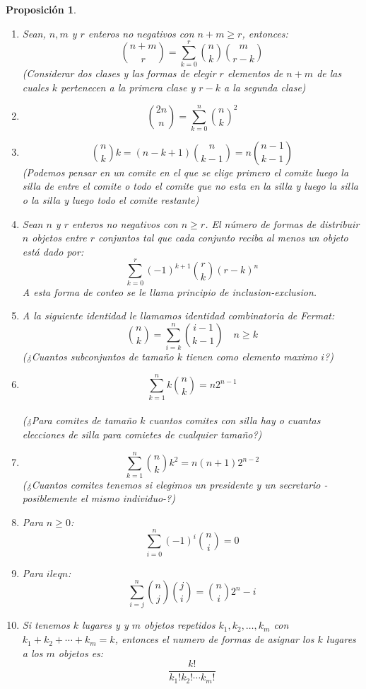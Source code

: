 \documentclass[14pt]{extarticle}
\newtheorem{theorem}{Teorema}[section]
\newtheorem{proposition}[theorem]{Proposición}
\begin{document}
\begin{proposition}
    \begin{enumerate}
    \item Sean, $n, m$ y $r$ enteros no negativos con $n + m \geq r$, entonces:
    $$ \binom{n+m}{r} = \sum_{k=0}^r \binom{n}{k} \binom{m}{r-k} $$
    (Considerar dos clases y las formas de elegir $r$ elementos de $n+m$ de las cuales $k$ pertenecen a la primera clase y $r-k$ a la segunda clase)

    \item $$ \binom{2n}{n} = \sum_{k=0}^n \binom{n}{k}^2 $$
    \item $$ \binom{n}{k} k = (n-k + 1) \binom{n}{k-1} = n \binom{n-1}{k-1} $$
    (Podemos pensar en un comite en el que se elige primero el comite luego la silla de entre el comite o todo el comite que no esta en la silla y luego la silla
o la silla y luego todo el comite restante)
    \item Sean $n$ y $r$ enteros no negativos con $n \geq r$. El número de formas de distribuir $n$ objetos entre $r$ conjuntos
    tal que cada conjunto reciba al menos un objeto está dado por:
    \[
        \sum_{k=0}^r (-1)^{k+1}\binom{r}{k}(r-k)^n
    \]
    A esta forma de conteo se le llama principio de inclusion-exclusion.
    \item A la siguiente identidad le llamamos identidad combinatoria de Fermat:
    \[
        \binom{n}{k} = \sum_{i = k}^n \binom{i-1}{k-1} \quad n \geq k
    \]
    (¿Cuantos subconjuntos de tamaño $k$ tienen como elemento maximo $i$?)
    \item $$ \sum_{k=1}^n k \binom{n}{k} = n 2^{n-1} $$\\
    (¿Para comites de tamaño $k$ cuantos comites con silla hay o cuantas elecciones de silla para comietes de cualquier tamaño?)
    \item $$ \sum_{k=1}^n \binom{n}{k}k^2 = n (n+1) 2^{n-2} $$
    (¿Cuantos comites tenemos si elegimos un presidente y un secretario -posiblemente el mismo individuo-?)
    \item Para $n\geq 0$:
    \[
        \sum_{i=0}^n (-1)^{i}\binom{n}{i} = 0
    \]
    \item Para $i leq n$:$$\sum_{i=j}^n \binom{n}{j}\binom{j}{i} = \binom{n}{i} 2^n-i$$
    \item Si tenemos $k$ lugares y y $m$ objetos repetidos $k_1, k_2, \ldots, k_m$ con $k_1 + k_2 + \cdots + k_m = k$, entonces
    el numero de formas de asignar los $k$ lugares a los $m$ objetos es:
    \[
        \frac{k!}{k_1! k_2! \cdots k_m!}
    \]
    \end{enumerate}
\end{proposition}






\end{document}
